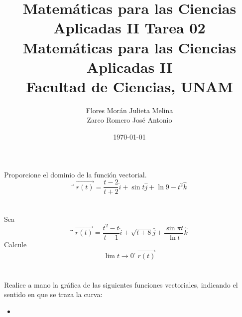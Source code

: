 \documentclass[12pt]{article}
\title{Matemáticas para las Ciencias Aplicadas II}
\title{
	\textbf{Tarea 02} \\
	\vspace{1ex}
	\large Matemáticas para las Ciencias Aplicadas II \\
	Facultad de Ciencias, UNAM}
\date{\today}
\author{Flores Morán Julieta Melina \\ Zarco Romero José Antonio}
\begin{document}
\maketitle

\section{}

Proporcione el dominio de la función vectorial.
$$
⃗\vec{r(t)}
=
\frac{t-2}{t+2}\hat{i}
+
\sin{t}\hat{j}
+
\ln{9-t^2}\hat{k}
$$

\section{}

Sea
$$
⃗\vec{r(t)}
=
\frac{t^2-t}{t-1}\hat{i}
+
\sqrt{t+8}\hat{j}
+
\frac{\sin{\pi t}}{\ln{t}}\hat{k}
$$
Calcule $$ \lim{t \to 0} ⃗\vec{r(t)} $$

\section{}

Realice a mano la gráfica de las siguientes funciones vectoriales, indicando el sentido en que se traza la curva:
\begin{itemize}[format=\textbf]

\item 

\end{itemize}

\section{}
\end{document}
